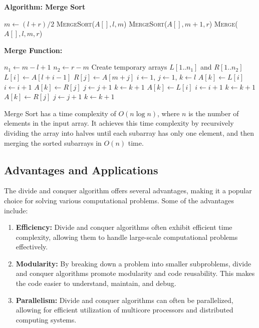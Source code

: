 \documentclass[12pt]{book} %
\begin{document}
\textbf{Algorithm: Merge Sort}
\FloatBarrier
\begin{algorithmic}[1]
        \State $m \gets (l + r) / 2$
        \State \textsc{MergeSort}($A[], l, m$) 
        \State \textsc{MergeSort}($A[], m+1, r$) 
        \State \textsc{Merge}($A[], l, m, r$) 
    \EndIf
\EndProcedure
\end{algorithmic}
\FloatBarrier
\textbf{Merge Function:}
\FloatBarrier
\begin{algorithmic}[1]
    \State $n_1 \gets m - l + 1$
    \State $n_2 \gets r - m$
    \State Create temporary arrays $L[1..n_1]$ and $R[1..n_2]$
        \State $L[i] \gets A[l + i - 1]$
    \EndFor
        \State $R[j] \gets A[m + j]$
    \EndFor
    \State $i \gets 1$, $j \gets 1$, $k \gets l$
            \State $A[k] \gets L[i]$
            \State $i \gets i + 1$
        \Else
            \State $A[k] \gets R[j]$
            \State $j \gets j + 1$
        \EndIf
        \State $k \gets k + 1$
    \EndWhile
        \State $A[k] \gets L[i]$
        \State $i \gets i + 1$
        \State $k \gets k + 1$
    \EndWhile
        \State $A[k] \gets R[j]$
        \State $j \gets j + 1$
        \State $k \gets k + 1$
    \EndWhile
\EndProcedure
\end{algorithmic}
\FloatBarrier
Merge Sort has a time complexity of $O(n \log n)$, where $n$ is the number of elements in the input array. It achieves this time complexity by recursively dividing the array into halves until each subarray has only one element, and then merging the sorted subarrays in $O(n)$ time.

\subsection{Advantages and Applications}

The divide and conquer algorithm offers several advantages, making it a popular choice for solving various computational problems. Some of the advantages include:

\begin{enumerate}
    \item \textbf{Efficiency:} Divide and conquer algorithms often exhibit efficient time complexity, allowing them to handle large-scale computational problems effectively.
    
    \item \textbf{Modularity:} By breaking down a problem into smaller subproblems, divide and conquer algorithms promote modularity and code reusability. This makes the code easier to understand, maintain, and debug.
    
    \item \textbf{Parallelism:} Divide and conquer algorithms can often be parallelized, allowing for efficient utilization of multicore processors and distributed computing systems.
\end{enumerate}
\end{document}
